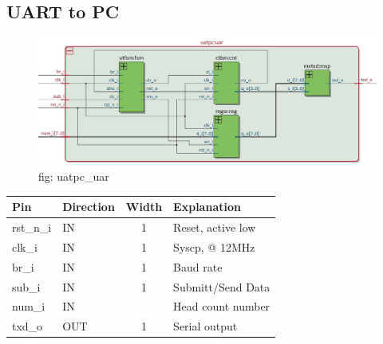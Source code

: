 \documentclass[12pt,a4 paper] {article}
\begin{document}
\subsection{UART to PC}
\begin{figure}[h]
	\centering	
	\includegraphics[scale=0.3]{../png/uatpc_uar.png}
	\newline
	fig: uatpc\_uar\\
\end{figure}
\begin{center}
	\begin{tabular}{| p{2cm} | p{2cm} | c| p{4cm} |}
		\hline
		Pin & Direction & Width & Explanation\\
		\hline	
  		rst\_n\_i & IN & 1 & Reset, active low\\
  		\hline
		clk\_i & IN & 1 &  Syscp, @ 12MHz \\
		\hline
		br\_i    & IN & 1 &      Baud rate \\
		\hline
		sub\_i   & IN & 1 &        Submitt/Send Data\\
		\hline
		num\_i   & IN  & &		Head count number\\
		\hline
		txd\_o   & OUT & 1 &       Serial output \\
		\hline
	\end{tabular}
\end{center}
\newpage
\end{document}
